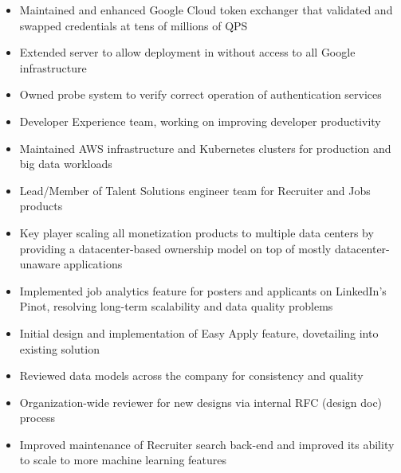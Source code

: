 \documentclass[letterpaper,11pt,twoside]{article}
\begin{document}
\vspace{-14pt}
\begin{itemize}
\item Maintained and enhanced Google Cloud token exchanger that validated
  and swapped credentials at tens of millions of QPS
\item Extended server to allow deployment in without access to all Google infrastructure
\item Owned probe system to verify correct operation of authentication services
\end{itemize}

\vspace{-14pt}
\begin{itemize}
\item Developer Experience team, working on improving developer productivity
\item Maintained AWS infrastructure and Kubernetes clusters for production and
  big data workloads
\end{itemize}

\vspace{-14pt}
\begin{itemize}
\item Lead/Member of Talent Solutions engineer team for Recruiter and Jobs products
\item Key player scaling all monetization products to multiple data centers by providing
  a datacenter-based ownership model on top of mostly datacenter-unaware applications
\item Implemented job analytics feature for posters and applicants on LinkedIn's Pinot,
  resolving long-term scalability and data quality problems
\item Initial design and implementation of Easy Apply feature, dovetailing into existing solution
\item Reviewed data models across the company for consistency and quality
\item Organization-wide reviewer for new designs via internal RFC (design doc) process
\item Improved maintenance of Recruiter search back-end and improved its
  ability to scale to more machine learning features
\end{itemize}
\end{document}

